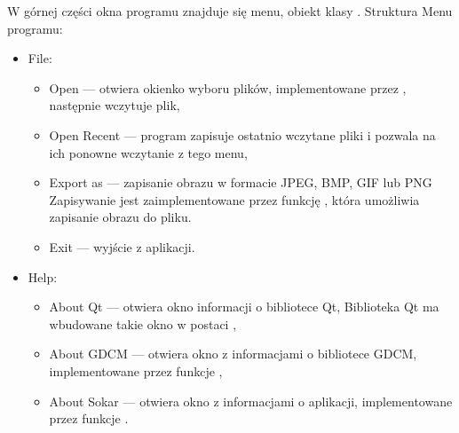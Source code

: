 \par
W górnej części okna programu znajduje się menu, obiekt klasy .
Struktura Menu programu:
\begin{itemize}
    \item File:
          \begin{itemize}
              \item Open --- otwiera okienko wyboru plików, implementowane przez , następnie wczytuje plik,
              \item Open Recent --- program zapisuje ostatnio wczytane pliki i pozwala na ich ponowne wczytanie z tego menu,
              \item Export as --- zapisanie obrazu w formacie JPEG, BMP, GIF lub PNG
                    Zapisywanie jest zaimplementowane przez funkcję , która umożliwia zapisanie obrazu do pliku.
              \item Exit --- wyjście z aplikacji.
          \end{itemize}
    \item Help:
          \begin{itemize}
              \item About Qt --- otwiera okno informacji o bibliotece Qt,
                    Biblioteka Qt ma wbudowane takie okno w postaci ,
              \item About GDCM --- otwiera okno z informacjami o bibliotece GDCM, implementowane przez funkcje ,
              \item About Sokar --- otwiera okno z informacjami o aplikacji, implementowane przez funkcje .
          \end{itemize}
\end{itemize}